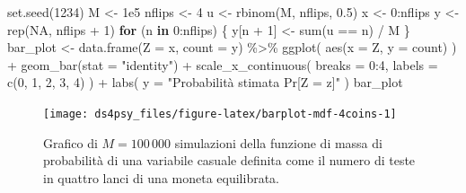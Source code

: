 \documentclass[
  11pt,
]{krantz}
\makeatletter
\newenvironment{Shaded}{\begin{snugshade}}{\end{snugshade}}
\newcommand{\AttributeTok}[1]{\textcolor[rgb]{0.61,0.61,0.61}{#1}}
\newcommand{\ConstantTok}[1]{\textcolor[rgb]{0,0,0}{#1}}
\newcommand{\ControlFlowTok}[1]{\textcolor[rgb]{0.27,0.27,0.27}{\textbf{#1}}}
\newcommand{\DecValTok}[1]{\textcolor[rgb]{0.06,0.06,0.06}{#1}}
\newcommand{\FloatTok}[1]{\textcolor[rgb]{0.06,0.06,0.06}{#1}}
\newcommand{\FunctionTok}[1]{\textcolor[rgb]{0,0,0}{#1}}
\newcommand{\NormalTok}[1]{#1}
\newcommand{\OtherTok}[1]{\textcolor[rgb]{0.37,0.37,0.37}{#1}}
\newcommand{\SpecialCharTok}[1]{\textcolor[rgb]{0,0,0}{#1}}
\newcommand{\StringTok}[1]{\textcolor[rgb]{0.5,0.5,0.5}{#1}}
\newenvironment{kframe}{%
\medskip{}
\setlength{\fboxsep}{.8em}
 \def\at@end@of@kframe{}%
 \ifinner\ifhmode%
  \def\at@end@of@kframe{\end{minipage}}%
  \begin{minipage}{\columnwidth}%
 \fi\fi%
 \def\FrameCommand##1{\hskip\@totalleftmargin \hskip-\fboxsep
 \colorbox{shadecolor}{##1}\hskip-\fboxsep
     \hskip-\linewidth \hskip-\@totalleftmargin \hskip\columnwidth}%
 \MakeFramed {\advance\hsize-\width
   \@totalleftmargin\z@ \linewidth\hsize
   \@setminipage}}%
 {\par\unskip\endMakeFramed%
 \at@end@of@kframe}
\renewenvironment{Shaded}{\begin{kframe}}{\end{kframe}}
\theoremstyle{definition}
\theoremstyle{definition}
\theoremstyle{definition}
\theoremstyle{definition}
\theoremstyle{remark}
\makeatother
\begin{document}
\begin{Shaded}
\begin{Highlighting}[]
\FunctionTok{set.seed}\NormalTok{(}\DecValTok{1234}\NormalTok{)}
\NormalTok{M }\OtherTok{\textless{}{-}} \FloatTok{1e5}
\NormalTok{nflips }\OtherTok{\textless{}{-}} \DecValTok{4}
\NormalTok{u }\OtherTok{\textless{}{-}} \FunctionTok{rbinom}\NormalTok{(M, nflips, }\FloatTok{0.5}\NormalTok{)}
\NormalTok{x }\OtherTok{\textless{}{-}} \DecValTok{0}\SpecialCharTok{:}\NormalTok{nflips}
\NormalTok{y }\OtherTok{\textless{}{-}} \FunctionTok{rep}\NormalTok{(}\ConstantTok{NA}\NormalTok{, nflips }\SpecialCharTok{+} \DecValTok{1}\NormalTok{)}
\ControlFlowTok{for}\NormalTok{ (n }\ControlFlowTok{in} \DecValTok{0}\SpecialCharTok{:}\NormalTok{nflips) \{}
\NormalTok{  y[n }\SpecialCharTok{+} \DecValTok{1}\NormalTok{] }\OtherTok{\textless{}{-}} \FunctionTok{sum}\NormalTok{(u }\SpecialCharTok{==}\NormalTok{ n) }\SpecialCharTok{/}\NormalTok{ M}
\NormalTok{\}}
\NormalTok{bar\_plot }\OtherTok{\textless{}{-}}
  \FunctionTok{data.frame}\NormalTok{(}\AttributeTok{Z =}\NormalTok{ x, }\AttributeTok{count =}\NormalTok{ y) }\SpecialCharTok{\%\textgreater{}\%}
  \FunctionTok{ggplot}\NormalTok{(}
    \FunctionTok{aes}\NormalTok{(}\AttributeTok{x =}\NormalTok{ Z, }\AttributeTok{y =}\NormalTok{ count)}
\NormalTok{  ) }\SpecialCharTok{+}
  \FunctionTok{geom\_bar}\NormalTok{(}\AttributeTok{stat =} \StringTok{"identity"}\NormalTok{) }\SpecialCharTok{+}
  \FunctionTok{scale\_x\_continuous}\NormalTok{(}
    \AttributeTok{breaks =} \DecValTok{0}\SpecialCharTok{:}\DecValTok{4}\NormalTok{,}
    \AttributeTok{labels =} \FunctionTok{c}\NormalTok{(}\DecValTok{0}\NormalTok{, }\DecValTok{1}\NormalTok{, }\DecValTok{2}\NormalTok{, }\DecValTok{3}\NormalTok{, }\DecValTok{4}\NormalTok{)}
\NormalTok{  ) }\SpecialCharTok{+}
  \FunctionTok{labs}\NormalTok{(}
    \AttributeTok{y =} \StringTok{"Probabilità stimata Pr[Z = z]"}
\NormalTok{  )}
\NormalTok{bar\_plot}
\end{Highlighting}
\end{Shaded}

\begin{figure}

{\centering \texttt{[image: ds4psy\_files/figure-latex/barplot-mdf-4coins-1]} 

}

\caption{Grafico di $M = 100\,000$ simulazioni della funzione di massa di probabilità di una variabile casuale definita come il numero di teste in quattro lanci di una moneta equilibrata.}\label{fig:barplot-mdf-4coins}
\end{figure}
\end{document}
